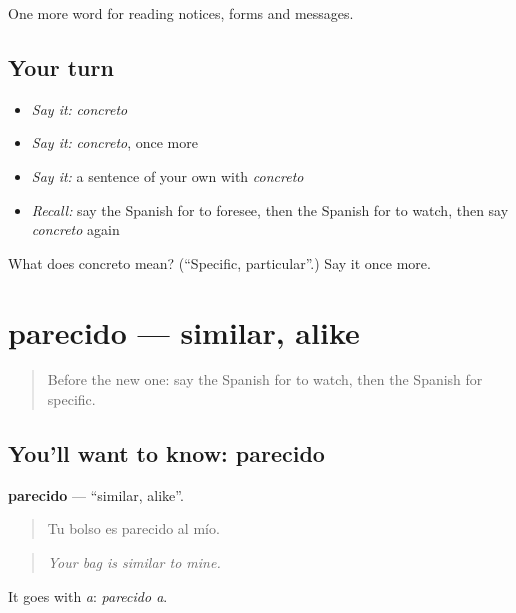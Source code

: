\begin{grammarlens}[title={What you've built}]
One more word for reading notices, forms and messages.
\end{grammarlens}

\subsection*{Your turn}
\begin{itemize}
\raggedright
  \item \emph{Say it:} \emph{concreto}
  \item \emph{Say it:} \emph{concreto}, once more
  \item \emph{Say it:} a sentence of your own with \emph{concreto}
  \item \emph{Recall:} say the Spanish for to foresee, then the Spanish for to watch, then say \emph{concreto} again
\end{itemize}

\begin{tcolorbox}[breakable,colback=teal!4,colframe=teal!35!black,title={Before you move on}]
What does concreto mean? (\textquotedblleft{}Specific, particular\textquotedblright{}.) Say it once more.
\end{tcolorbox}
\section[parecido]{parecido — similar, alike}

\label{lesson:ES-C482-parecido}



\begin{quote}
Before the new one: say the Spanish for to watch, then the Spanish for specific.
\end{quote}

\subsection*{You'll want to know: parecido}
\textbf{parecido} — \textquotedblleft{}similar, alike\textquotedblright{}.

\begin{quote}
Tu bolso es parecido al mío.
\end{quote}

\begin{quote}
\emph{Your bag is similar to mine.}
\end{quote}

It goes with \emph{a}: \emph{parecido a}.

